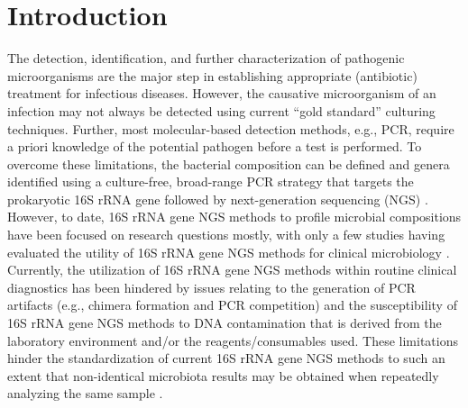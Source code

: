 \section*{Introduction}
The detection, identification, and further characterization of pathogenic microorganisms are the major step in establishing
appropriate (antibiotic) treatment for infectious diseases. However, the causative microorganism of an infection may not
always be detected using current “gold standard” culturing techniques. Further, most molecular-based detection methods,
e.g., PCR, require a priori knowledge of the potential pathogen before a test is performed. To overcome these limitations,
the bacterial composition can be defined and genera identified using a culture-free, broad-range PCR strategy that targets
the prokaryotic 16S rRNA gene followed by next-generation sequencing (NGS) \cite{fournier2011prospects}. However, to date,
16S rRNA gene NGS methods to profile microbial compositions have been focused on research questions mostly, with only a few
studies having evaluated the utility of 16S rRNA gene NGS methods for clinical microbiology \cite{rhoads2012comparison,salipante2013rapid}.
Currently, the utilization of 16S rRNA gene NGS methods within routine clinical diagnostics has been hindered by issues
relating to the generation of PCR artifacts (e.g., chimera formation and PCR competition) and the susceptibility of 16S rRNA
gene NGS methods to DNA contamination that is derived from the laboratory environment and/or the reagents/consumables used.
These limitations hinder the standardization of current 16S rRNA gene NGS methods to such an extent that non-identical
microbiota results may be obtained when repeatedly analyzing the same sample \cite{hiergeist2016multicenter}.

